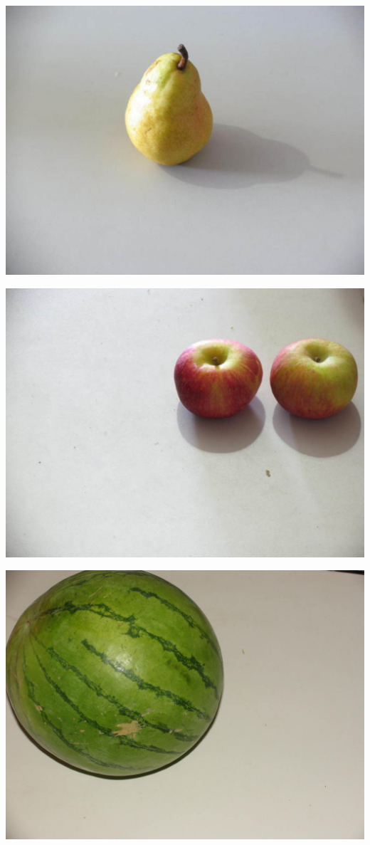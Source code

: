 \documentclass{article}
\begin{document}
\begin{multicols}{2}
\centering
{}
\includegraphics[scale=0.3]{../data/spanish_pear_001.jpg}

\centering
{}
\includegraphics[scale=0.3]{../data/fuji_apple_001.jpg}

\centering
{}
\includegraphics[scale=0.3]{../data/watermelon_001.jpg}




\end{multicols}
\end{document}
